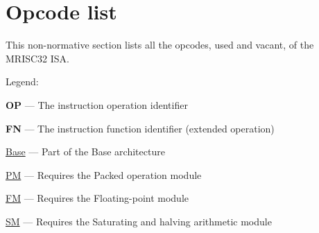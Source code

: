 %

\chapter{Opcode list}

This non-normative section lists all the opcodes, used and vacant, of the
MRISC32 ISA.

Legend:
\begin{bulletitems}
  \item{\textbf{OP} --- The instruction operation identifier}
  \item{\textbf{FN} --- The instruction function identifier (extended operation)}
  \item{\hyperref[module:Base]{Base} --- Part of the Base architecture}
  \item{\hyperref[module:PM]{PM} --- Requires the Packed operation module}
  \item{\hyperref[module:FM]{FM} --- Requires the Floating-point module}
  \item{\hyperref[module:SM]{SM} --- Requires the Saturating and halving arithmetic module}
\end{bulletitems}


